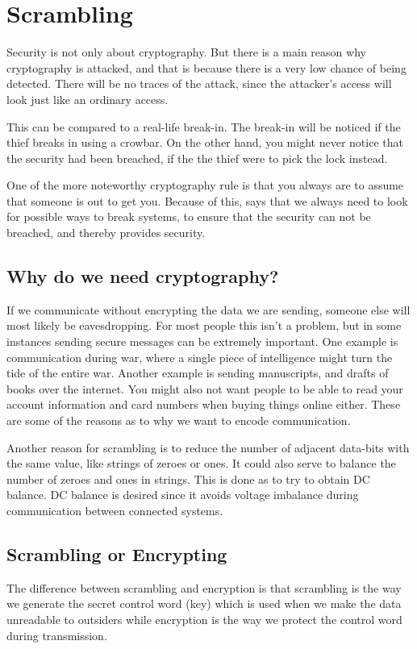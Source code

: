 \chapter{Scrambling}\label{ch:Scrambling}
Security is not only about cryptography. But there is a main reason why 
cryptography is attacked, and that is because there is a very low chance of being
detected. There will be no traces of the attack, since the attacker’s access will
look just like an ordinary access.

This can be compared to a real-life break-in. The break-in will be noticed if 
the thief breaks in using a crowbar. On the other hand, you might never notice 
that the security had been breached, if the the thief were to pick the lock 
instead. \citep{Schneier:2003}

One of the more noteworthy cryptography rule is that you always are to assume 
that someone is out to get you. Because of this, 
\citet[pp. 12--14]{Schneier:2003} says that we always need to look for possible 
ways to break systems, to ensure that the security can not be breached, and 
thereby provides security.

\section{Why do we need cryptography?}
If we communicate without encrypting the data we are sending, someone else will 
most likely be eavesdropping. For most people this isn’t a problem, but in some 
instances sending secure messages can be extremely important. One example is 
communication during war, where a single piece of intelligence might turn the 
tide of the entire war. Another example is sending manuscripts, and drafts of 
books over the internet. You might also not want people to be able to read your 
account information and card numbers when buying things online either. These are 
some of the reasons as to why we want to encode communication.

Another reason for scrambling is to reduce the number of adjacent data-bits with 
the same value, like strings of zeroes or ones. It could also serve to balance 
the number of zeroes and ones in strings. This is done as to try to obtain DC 
balance. DC balance is desired since it avoids voltage imbalance during 
communication between connected systems. 


\section{Scrambling or Encrypting}
The difference between scrambling and encryption is that scrambling is the
way we generate the secret control word (key) which is used when we make the
data unreadable to outsiders while encryption is the way we protect the control 
word during transmission.

